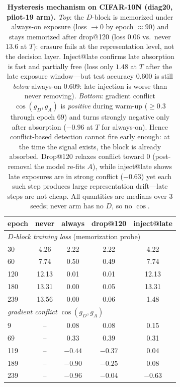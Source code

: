 \documentclass{article}
\begin{document}
\begin{table}[t]
\centering
\small
\setlength{\tabcolsep}{3.5pt}
\begin{tabular}{lcccc}
\toprule
epoch & never & always & drop@120 & inject@late \\
\midrule
\multicolumn{5}{l}{\emph{$D$-block training loss} (memorization probe)}\\
30  & 4.26 & 2.22 & 2.22 & 4.22 \\
60  & 7.74 & 0.50 & 0.49 & 7.74 \\
120 & 12.13 & 0.01 & 0.01 & 12.13 \\
180 & 13.31 & 0.00 & 0.05 & 13.31 \\
239 & 13.56 & 0.00 & 0.06 & 1.48 \\
\midrule
\multicolumn{5}{l}{\emph{gradient conflict $\cos(g_D,g_A)$}}\\
9   & -- & 0.08 & 0.08 & 0.15 \\
69  & -- & 0.33 & 0.39 & 0.31 \\
119 & -- & $-0.44$ & $-0.37$ & 0.04 \\
189 & -- & $-0.90$ & $-0.25$ & $0.08$ \\
239 & -- & $-0.96$ & $-0.04$ & $-0.63$ \\
\bottomrule
\end{tabular}
\caption{\textbf{Hysteresis mechanism on CIFAR-10N (diag20, pilot-19 arm).} \emph{Top}: the
$D$-block is memorized under always-on exposure (loss $\to0$ by epoch $\approx90$) and stays
memorized after drop@120 (loss $0.06$ vs.\ never $13.6$ at $T$): erasure fails at the
representation level, not the decision layer. Inject@late confirms late absorption is fast and
partially free (loss only $1.48$ at $T$ after the late exposure window---but test accuracy
$0.600$ is still \emph{below} always-on $0.609$: late injection is worse than never removing).
\emph{Bottom}: gradient conflict $\cos(g_D,g_A)$ is \emph{positive} during warm-up
($\ge0.3$ through epoch $69$) and turns strongly negative only after absorption
($-0.96$ at $T$ for always-on). Hence conflict-based detection cannot fire early enough: at the
time the signal exists, the block is already absorbed. Drop@120 relaxes conflict toward $0$
(post-removal the model re-fits $A$), while inject@late shows late exposures are in strong
conflict ($-0.63$) yet each such step produces large representation drift---late steps are not
cheap. All quantities are medians over 3 seeds; never arm has no $D$, so no $\cos$.}
\label{tab:diag20}
\end{table}
\end{document}
